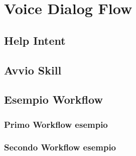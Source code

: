 \chapter{Voice Dialog Flow}

\section{Help Intent}

\section{Avvio Skill}

\section{Esempio Workflow}
\subsection{Primo Workflow esempio}

\subsection{Secondo Workflow esempio}
